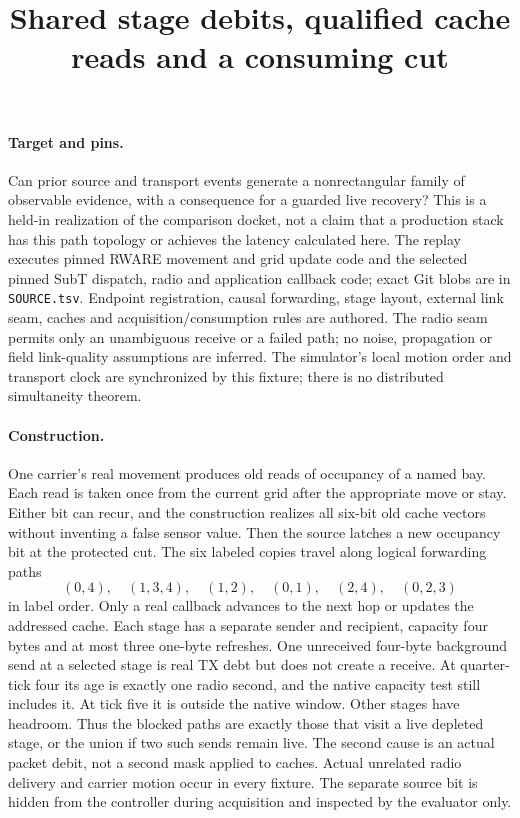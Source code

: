 \documentclass{article}
\title{Shared stage debits, qualified cache reads and a consuming cut}
\date{}
\begin{document}
\maketitle

\paragraph{Target and pins.}
Can prior source and transport events generate a nonrectangular family
of observable evidence, with a consequence for a guarded live recovery?
This is a held-in realization of the comparison docket, not
a claim that a production stack has this path topology or achieves the
latency calculated here. The replay executes pinned RWARE movement and
grid update code and the selected pinned SubT dispatch, radio and
application callback code; exact Git blobs are in \verb|SOURCE.tsv|.
Endpoint registration, causal forwarding, stage layout, external link
seam, caches and acquisition/consumption rules are authored. The
radio seam permits only an unambiguous receive or a failed path; no
noise, propagation or field link-quality assumptions are inferred.
The simulator's local motion order and transport clock are synchronized
by this fixture; there is no distributed simultaneity theorem.

\paragraph{Construction.}
One carrier's real movement produces old reads of occupancy of a named
bay. Each read is taken once from the current grid after the appropriate
move or stay. Either bit can recur, and the construction realizes all
six-bit old cache vectors without inventing a false sensor value.
Then the source latches a new occupancy bit at the protected cut. The
six labeled copies travel along logical forwarding paths
\[
(0,4),\quad(1,3,4),\quad(1,2),\quad(0,1),\quad(2,4),\quad(0,2,3)
\]
in label order. Only a real callback advances to the next hop or
updates the addressed cache. Each stage has a separate sender and
recipient, capacity four bytes and at most three one-byte refreshes.
One unreceived four-byte background send at a selected stage is real
TX debt but does not create a receive. At quarter-tick four its age
is exactly one radio second, and the native capacity test still
includes it. At tick five it is outside the native window. Other
stages have headroom. Thus the blocked paths are exactly those that
visit a live depleted stage, or the union if two such sends remain
live. The second cause is an actual packet debit, not a second mask
applied to caches. Actual unrelated radio delivery and carrier motion
occur in every fixture. The separate source bit is hidden from the
controller during acquisition and inspected by the evaluator only.
\end{document}
